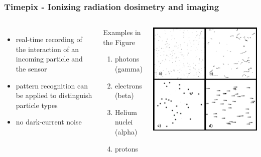 \documentclass[aspectratio=169]{beamer}
\begin{document}
\begin{frame}
\frametitle{Timepix - Ionizing radiation dosimetry and imaging}

\begin{columns}[c]


\begin{itemize}
  \item real-time recording of the interaction of an incoming particle and the sensor
  \item pattern recognition can be applied to distinguish particle types \cite{baca2018timepix}
  \item no dark-current noise
\end{itemize}

\begin{block}{Examples in the Figure}
\begin{enumerate}[label=(\alph*)]
  \item photons (gamma)
  \item electrons (beta)
  \item Helium nuclei (alpha)
  \item protons
\end{enumerate}
\end{block}

\includegraphics[width=1.0\textwidth]{./fig/particle_types_inverted.png}

\end{columns}

\end{frame}
\end{document}
